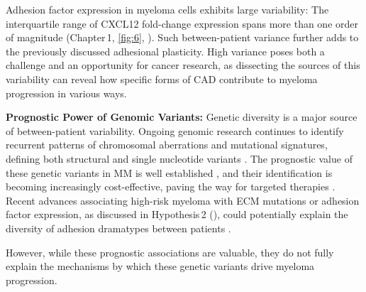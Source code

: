 \unnsubsection{\cadddiversitytitle}%
\label{sec:discussion_cadddiversity}%
Adhesion factor expression in myeloma cells exhibits large variability: The
interquartile range of CXCL12 fold-change expression spans more than one order
of magnitude (Chapter\,1, \autoref{fig:6}, ). Such
between-patient variance further adds to the previously discussed adhesional
plasticity. High
variance poses both a challenge and an opportunity for cancer research, as
dissecting the sources of this variability can reveal how specific forms
of \ac{CAD} contribute to myeloma progression in various ways.


\textbf{Prognostic Power of Genomic Variants:}
Genetic diversity is a major source of between-patient variability. Ongoing
genomic research continues to identify recurrent patterns of chromosomal
aberrations and mutational signatures, defining both structural and single
nucleotide variants \cite{kumarMultipleMyelomasCurrent2018a,
      hoangMutationalProcessesContributing2019}. The prognostic value of these genetic
variants in MM is well established \cite{sharmaPrognosticRoleMYC2021}, and their
identification is becoming increasingly cost-effective, paving the way for
targeted therapies \cite{zouComprehensiveApproachEvaluate2024,
      budurleanIntegratingOpticalGenome2024}. Recent advances associating high-risk
myeloma with \ac{ECM} mutations or adhesion factor expression, as discussed in
Hypothesis\,2 (), could potentially
explain the diversity of adhesion dramatypes between patients
\cite{eversPrognosticValueExtracellular2023,
      huDevelopmentCellAdhesionbased2024}.

However, while these prognostic associations are valuable, they do not fully
explain the mechanisms by which these genetic variants drive myeloma
progression.



